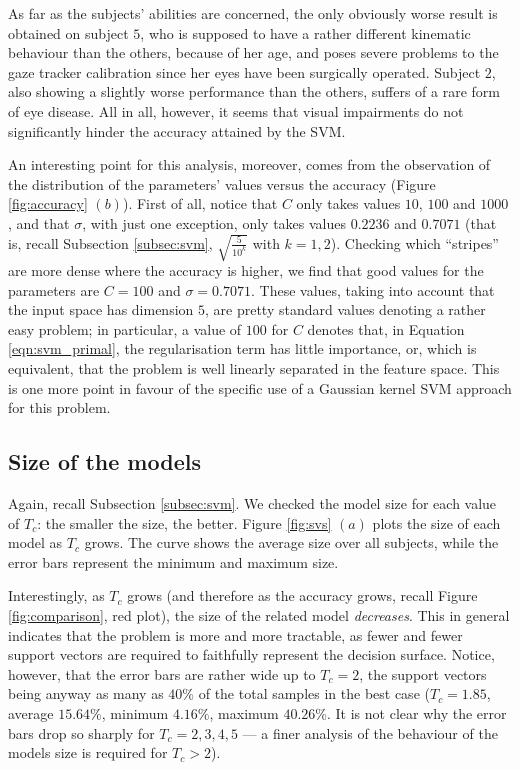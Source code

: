 \documentclass{article}
\begin{document}
As far as the subjects' abilities are concerned, the only obviously
worse result is obtained on subject $5$, who is supposed to have a
rather different kinematic behaviour than the others, because of her
age, and poses severe problems to the gaze tracker calibration since
her eyes have been surgically operated. Subject $2$, also showing a
slightly worse performance than the others, suffers of a rare form of
eye disease. All in all, however, it seems that visual impairments do
not significantly hinder the accuracy attained by the SVM.

An interesting point for this analysis, moreover, comes from the
observation of the distribution of the parameters' values versus the
accuracy (Figure \ref{fig:accuracy} $(b)$). First of all, notice that
$C$ only takes values $10$, $100$ and $1000$, and that $\sigma$, with
just one exception, only takes values $0.2236$ and $0.7071$ (that is,
recall Subsection \ref{subsec:svm}, $\sqrt{\frac{5}{10^{k}}}$ with
$k=1,2$). Checking which ``stripes'' are more dense where the accuracy
is higher, we find that good values for the parameters are $C=100$ and
$\sigma=0.7071$. These values, taking into account that the input
space has dimension $5$, are pretty standard values denoting a rather
easy problem; in particular, a value of $100$ for $C$ denotes that, in
Equation \ref{eqn:svm_primal}, the regularisation term has little
importance, or, which is equivalent, that the problem is well linearly
separated in the feature space. This is one more point in favour of
the specific use of a Gaussian kernel SVM approach for this
problem.

\subsection{Size of the models}

Again, recall Subsection \ref{subsec:svm}. We checked the model size
for each value of $T_c$: the smaller the size, the better. Figure
\ref{fig:svs} $(a)$ plots the size of each model as $T_c$ grows. The
curve shows the average size over all subjects, while the error bars
represent the minimum and maximum size.

Interestingly, as $T_c$ grows (and therefore as the accuracy grows,
recall Figure \ref{fig:comparison}, red plot), the size of the related
model \emph{decreases}. This in general indicates that the problem is
more and more tractable, as fewer and fewer support vectors are
required to faithfully represent the decision surface. Notice,
however, that the error bars are rather wide up to $T_c=2$, the
support vectors being anyway as many as $40\%$ of the total samples in
the best case ($T_c=1.85$, average $15.64\%$, minimum $4.16\%$,
maximum $40.26\%$. It is not clear why the error bars drop so sharply
for $T_c=2,3,4,5$ --- a finer analysis of the behaviour of the models
size is required for $T_c>2$).
\end{document}
